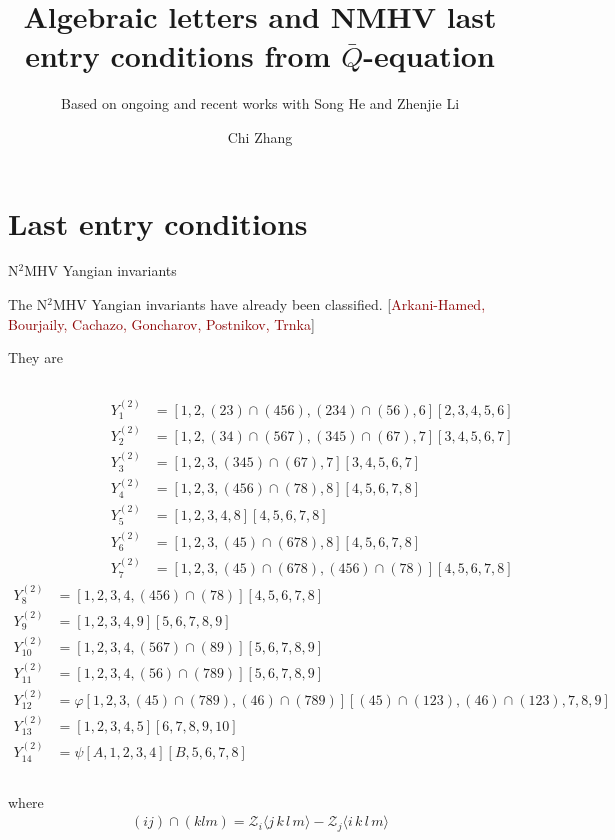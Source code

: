 \documentclass[10pt]{beamer}
\title{Algebraic letters and NMHV last entry conditions from $\bar{Q}$-equation}
\subtitle{\scriptsize Based on ongoing and recent works with Song He and Zhenjie Li}
\author{Chi Zhang}
\institute{Institute of Theoretical Physics, CAS}
\begin{document}
\maketitle




\section{Last entry conditions}


\begin{frame}[t]{N$^{2}$MHV Yangian invariants}


The N$^{2}$MHV Yangian invariants have already been classified. {\footnotesize[\textcolor{darkred}{Arkani-Hamed, Bourjaily, Cachazo, Goncharov, Postnikov, Trnka}]}

They are 
\begin{columns}
  \tiny
  \begin{align*}
    Y^{(2)}_1 &= [1,2,(23)\cap (456), (234) \cap (56) , 6] [2,3,4,5,6] \\
    \nonumber
    Y^{(2)}_2 &= [1,2,(34) \cap (567), (345) \cap (67), 7] [3,4,5,6,7] \\
    \nonumber
    Y^{(2)}_3 &= [1,2,3,(345) \cap (67), 7] [3,4,5,6,7] \\
    \nonumber
    Y^{(2)}_4 &= [1,2,3,(456) \cap (78), 8] [4,5,6,7,8] \\
    \nonumber
    Y^{(2)}_5 &= [1,2,3,4,8] [4,5,6,7,8] \\
    \nonumber
    Y^{(2)}_6 &= [1,2,3,(45) \cap (678), 8] [4,5,6,7,8] \\
    Y^{(2)}_7 &= [1,2,3,(45) \cap (678), (456) \cap (78)] [4,5,6,7,8]
  \end{align*}
  \tiny
  \begin{align*}
    Y^{(2)}_8 &= [1,2,3,4,(456) \cap (78)] [4,5,6,7,8] \\
    \nonumber
    Y^{(2)}_9 &= [1,2,3,4,9] [5,6,7,8,9] \\
    \nonumber
    Y^{(2)}_{10}&=[1,2,3,4,(567) \cap (89)] [5,6,7,8,9] \\
    \nonumber
    Y^{(2)}_{11}&=[1,2,3,4,(56) \cap (789)] [5,6,7,8,9] \\
    \nonumber
    Y^{(2)}_{12}&= \varphi 
    [1,2,3,(45) \cap (789) , (46) \cap (789)] [(45) \cap (123), (46) \cap (123), 7,8,9] \\
    Y^{(2)}_{13}&=[1,2,3,4,5][6,7,8,9,10] \\
    Y^{(2)}_{14}&=\psi [A,1,2,3,4][B,5,6,7,8]
    \nonumber
  \end{align*}
\end{columns}
  where
  \begin{align*}
  (i j) \cap (k l m ) = \mathcal{Z}_i \langle j\, k\, l\, m \rangle - \mathcal{Z}_j \langle i\, k \, l\, m \rangle
  \end{align*}

\end{frame}
\end{document}
